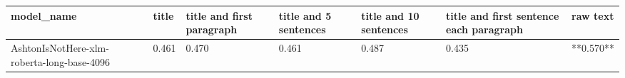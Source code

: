 \begin{tabular}{lllllll}
\toprule
                                model\_name & title & title and first paragraph & title and 5 sentences & title and 10 sentences & title and first sentence each paragraph &  raw text \\
\midrule
AshtonIsNotHere-xlm-roberta-long-base-4096 & 0.461 &                     0.470 &                 0.461 &                  0.487 &                                   0.435 & **0.570** \\
\bottomrule
\end{tabular}
